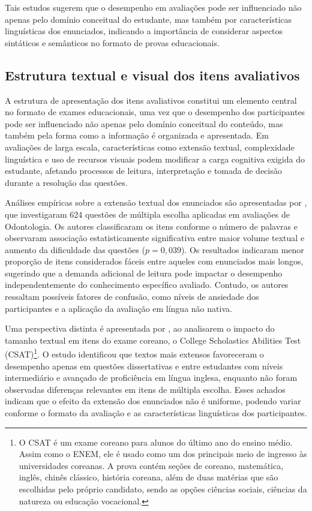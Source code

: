 \documentclass[a4paper,10pt, twocolumn]{article}
\begin{document}
Tais estudos sugerem que o desempenho em avaliações pode ser influenciado não apenas pelo domínio conceitual do estudante, mas também por características linguísticas dos enunciados, indicando a importância de considerar aspectos sintáticos e semânticos no formato de provas educacionais.

\subsection{Estrutura textual e visual dos itens avaliativos}

A estrutura de apresentação dos itens avaliativos constitui um elemento central no formato de exames educacionais, uma vez que o desempenho dos participantes pode ser influenciado não apenas pelo domínio conceitual do conteúdo, mas também pela forma como a informação é organizada e apresentada. Em avaliações de larga escala, características como extensão textual, complexidade linguística e uso de recursos visuais podem modificar a carga cognitiva exigida do estudante, afetando processos de leitura, interpretação e tomada de decisão durante a resolução das questões.

Análises empíricas sobre a extensão textual dos enunciados são apresentadas por \textcite{Pullishery2020}, que investigaram 624 questões de múltipla escolha aplicadas em avaliações de Odontologia. Os autores classificaram os itens conforme o número de palavras e observaram associação estatisticamente significativa entre maior volume textual e aumento da dificuldade das questões ($p = 0{,}039$). Os resultados indicaram menor proporção de itens considerados fáceis entre aqueles com enunciados mais longos, sugerindo que a demanda adicional de leitura pode impactar o desempenho independentemente do conhecimento específico avaliado. Contudo, os autores ressaltam possíveis fatores de confusão, como níveis de ansiedade dos participantes e a aplicação da avaliação em língua não nativa.

Uma perspectiva distinta é apresentada por \textcite{2018}, ao analisarem o impacto do tamanho textual em itens do exame coreano, o College Scholastics Abilities Test (CSAT)\footnote{O CSAT é um exame coreano para alunos do último ano do ensino médio. Assim como o ENEM, ele é usado como um dos principais meio de ingresso às universidades coreanas. A prova contém seções de coreano, matemática, inglês, chinês clássico, história coreana, além de duas matérias que são escolhidas pelo próprio candidato, sendo as opções ciências sociais, ciências da natureza ou educação vocacional.}. O estudo identificou que textos mais extensos favoreceram o desempenho apenas em questões dissertativas e entre estudantes com níveis intermediário e avançado de proficiência em língua inglesa, enquanto não foram observadas diferenças relevantes em itens de múltipla escolha. Esses achados indicam que o efeito da extensão dos enunciados não é uniforme, podendo variar conforme o formato da avaliação e as características linguísticas dos participantes.
\end{document}
